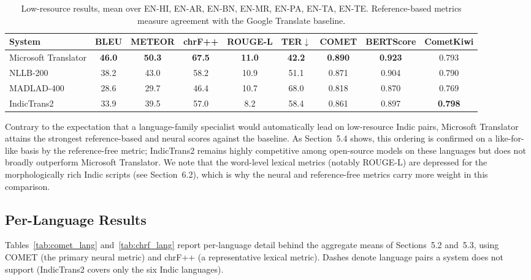 \documentclass[pdflatex,sn-mathphys-num]{sn-jnl}
\begin{document}
\begin{table}[h]
\centering
\caption{Low-resource results, mean over EN-HI, EN-AR, EN-BN, EN-MR, EN-PA, EN-TA, EN-TE. Reference-based metrics measure agreement with the Google Translate baseline.}\label{tab:low}
\tiny
\setlength{\tabcolsep}{2pt}
\begin{tabular}{@{} p{2.2cm} c c c c c c c c @{}}
\toprule
System & BLEU & METEOR & chrF++ & ROUGE-L & TER$\downarrow$ & COMET & BERTScore & CometKiwi \\
\midrule
Microsoft Translator & \textbf{46.0} & \textbf{50.3} & \textbf{67.5} & \textbf{11.0} & \textbf{42.2} & \textbf{0.890} & \textbf{0.923} & 0.793 \\
NLLB-200 & 38.2 & 43.0 & 58.2 & 10.9 & 51.1 & 0.871 & 0.904 & 0.790 \\
MADLAD-400 & 28.6 & 29.7 & 46.4 & 10.7 & 68.0 & 0.818 & 0.870 & 0.769 \\
IndicTrans2\footnotemark[1] & 33.9 & 39.5 & 57.0 & 8.2 & 58.4 & 0.861 & 0.897 & \textbf{0.798} \\
\bottomrule
\end{tabular}
\end{table}

Contrary to the expectation that a language-family specialist would automatically lead on low-resource Indic pairs, Microsoft Translator attains the strongest reference-based and neural scores against the baseline. As Section~5.4 shows, this ordering is confirmed on a like-for-like basis by the reference-free metric; IndicTrans2 remains highly competitive among open-source models on these languages but does not broadly outperform Microsoft Translator. We note that the word-level lexical metrics (notably ROUGE-L) are depressed for the morphologically rich Indic scripts (see Section~6.2), which is why the neural and reference-free metrics carry more weight in this comparison.

\subsection{Per-Language Results}

Tables~\ref{tab:comet_lang} and~\ref{tab:chrf_lang} report per-language detail behind the aggregate means of Sections~5.2 and~5.3, using COMET (the primary neural metric) and chrF++ (a representative lexical metric). Dashes denote language pairs a system does not support (IndicTrans2 covers only the six Indic languages).
\end{document}
